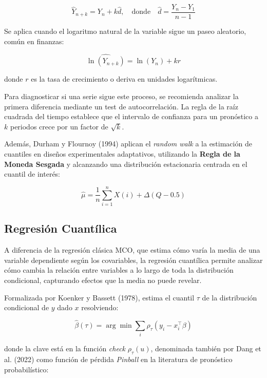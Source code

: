 ﻿\documentclass[11pt,a4paper]{article}
\begin{document}
\begin{equation}
\hat{Y}_{n+k} = Y_n + k \hat{d}, \quad \text{donde} \quad \hat{d} = \frac{Y_n - Y_1}{n-1}
\end{equation}

Se aplica cuando el logaritmo natural de la variable sigue un paseo aleatorio, común en finanzas:

\begin{equation}
\widehat{\ln(Y_{n+k})} = \ln(Y_n) + k r
\end{equation}

donde $r$ es la tasa de crecimiento o deriva en unidades logarítmicas.

Para diagnosticar si una serie sigue este proceso, se recomienda analizar la primera diferencia mediante un test de autocorrelación. La regla de la raíz cuadrada del tiempo establece que el intervalo de confianza para un pronóstico a $k$ periodos crece por un factor de $\sqrt{k}$.

Además, Durham y Flournoy (1994) aplican el \textit{random walk} a la estimación de cuantiles en diseños experimentales adaptativos, utilizando la \textbf{Regla de la Moneda Sesgada} y alcanzando una distribución estacionaria centrada en el cuantil de interés:

\begin{equation}
\hat{\mu} = \frac{1}{n} \sum_{i=1}^{n} X(i) + \Delta (Q - 0.5)
\end{equation}

\subsection{Regresión Cuantílica}

A diferencia de la regresión clásica MCO, que estima cómo varía la media de una variable dependiente según los covariables, la regresión cuantílica permite analizar cómo cambia la relación entre variables a lo largo de toda la distribución condicional, capturando efectos que la media no puede revelar.  

Formalizada por Koenker y Bassett (1978), estima el cuantil $\tau$ de la distribución condicional de $y$ dado $x$ resolviendo:

\[
\hat{\beta}(\tau)=\arg\min \sum_i \rho_\tau (y_i-x_i^\top \beta)
\]

donde la clave está en la función \textit{check} $\rho_\tau(u)$, denominada también por Dang et al. (2022) como función de pérdida \textit{Pinball} en la literatura de pronóstico probabilístico:
\end{document}
